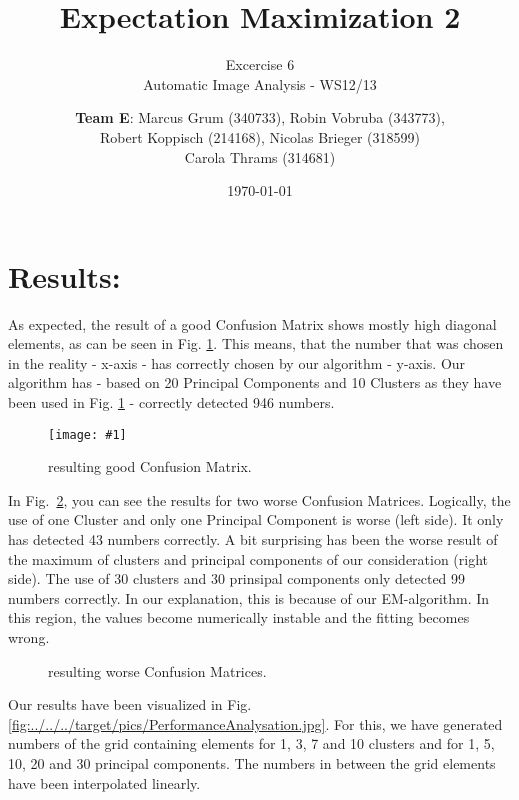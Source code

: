 \documentclass[a4paper,headings=small]{scrartcl}
\title{Expectation Maximization 2}
\subtitle{Excercise 6 \\ Automatic Image Analysis - WS12/13}
\author{\textbf{Team E}: Marcus Grum (340733), Robin Vobruba (343773), \\ Robert Koppisch (214168), Nicolas Brieger (318599)\\Carola Thrams (314681)}
\date{\today}
\numberwithin{equation}{section} %
\numberwithin{figure}{section}   %
\newcommand{\image}[3]{
	\begin{figure}[htbp]
		\centering
		\texttt{[image: \#1]}
		\caption{#3}
		\label{fig:#1}
	\end{figure}
}
\newcommand{\imgGeneratedRoot}{../../../target/pics}
\begin{document}
\maketitle

\section{Results:}

As expected, the result of a good Confusion Matrix shows mostly high diagonal elements,
as can be seen in Fig. \ref{fig:\imgGeneratedRoot/ConfusionMatrix_20PCA_10Cluster.jpg}.
This means, that the number that was chosen in the reality - x-axis - has correctly chosen
by our algorithm - y-axis.
Our algorithm has - based on 20 Principal Components and 10 Clusters
as they have been used in Fig. \ref{fig:\imgGeneratedRoot/ConfusionMatrix_20PCA_10Cluster.jpg} -
correctly detected 946 numbers.

\image{\imgGeneratedRoot/ConfusionMatrix_20PCA_10Cluster.jpg}{0.8}{%
		resulting good Confusion Matrix.}

In Fig.~\ref{fig:worseConfusionMatrices}, you can see the results for two worse Confusion Matrices.
Logically, the use of one Cluster and only one Principal Component is worse (left side).
It only has detected 43 numbers correctly.
A bit surprising has been the worse result of the maximum of clusters and principal components 
of our consideration (right side). The use of 30 clusters and 30 prinsipal components only detected 99 numbers
correctly. In our explanation, this is because of our EM-algorithm. In this region, the 
values become numerically instable and the fitting becomes wrong.

\begin{figure}
 \hfill
{} \hfill
\caption{resulting worse Confusion Matrices.}
\label{fig:worseConfusionMatrices}
\end{figure}

Our results have been visualized in Fig. \ref{fig:\imgGeneratedRoot/PerformanceAnalysation.jpg}.
For this, we have generated numbers of the grid containing elements for 1, 3, 7 and 10 clusters
and for 1, 5, 10, 20 and 30 principal components. The numbers in between the grid elements
have been interpolated linearly.
\end{document}
